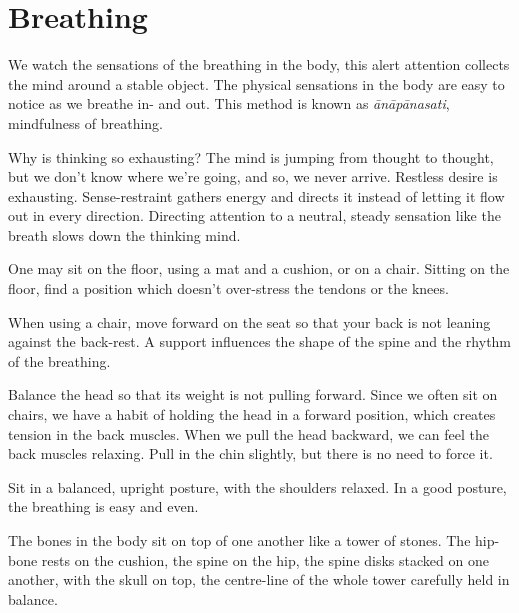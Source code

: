 \chapter{Breathing}


\noindent We watch the sensations of the breathing in the body, this
alert attention collects the mind around a stable object. The physical
sensations in the body are easy to notice as we breathe in- and out.
This method is known as \emph{ānāpānasati}, mindfulness of breathing.

Why is thinking so exhausting? The mind is jumping from thought to
thought, but we don't know where we're going, and so, we never arrive.
Restless desire is exhausting. Sense-restraint gathers energy and
directs it instead of letting it flow out in every direction. Directing
attention to a neutral, steady sensation like the breath slows down the
thinking mind.

One may sit on the floor, using a mat and a cushion, or on a chair.
Sitting on the floor, find a position which doesn't over-stress the
tendons or the knees.

When using a chair, move forward on the seat so that your back is not
leaning against the back-rest. A support influences the shape of the
spine and the rhythm of the breathing.

\enlargethispage*{\baselineskip}

Balance the head so that its weight is not pulling forward. Since we
often sit on chairs, we have a habit of holding the head in a forward
position, which creates tension in the back muscles. When we pull the
head backward, we can feel the back muscles relaxing. Pull in the chin
slightly, but there is no need to force it.

\clearpage
\thispagestyle{empty}\mbox{}
\clearpage

Sit in a balanced, upright posture, with the shoulders relaxed. In a
good posture, the breathing is easy and even.

The bones in the body sit on top of one another like a tower of stones.
The hip-bone rests on the cushion, the spine on the hip, the spine disks
stacked on one another, with the skull on top, the centre-line of the
whole tower carefully held in balance.

